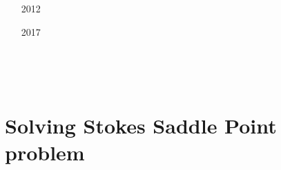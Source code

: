 \begin{scriptsize}
\begin{itemize}
\item[\twothousandfour] 
\textcite{rugy04} \\
\item[\twothousandfive] 
\textcite{rugy05} \\
\item[\twothousandeight] 
\textcite{chzy08} \\ 
\textcite{stmt08} \\
\textcite{bikh08} \\
\textcite{kadt08} \\
\textcite{faha}   \\
\item[2012] 
\textcite{may12} \\
\item[2017] 
\textcite{krke17} \\
\item[\twothousandeighteen] 
\textcite{cram18} \\
\item[\twothousandtwenty] 
\textcite{crsh20} \\
\end{itemize}
\end{scriptsize}

\section{Solving Stokes Saddle Point problem}

\begin{scriptsize}
\cite{laqu86}
\cite{rotf90}
\cite{frha93}
\cite{elgo94}
\cite{cheb96}\cite{elma96}
\cite{brpv97}
\cite{lixu01}
\cite{dogs06}\cite{lica06}
\cite{hoow17}
\end{scriptsize}



